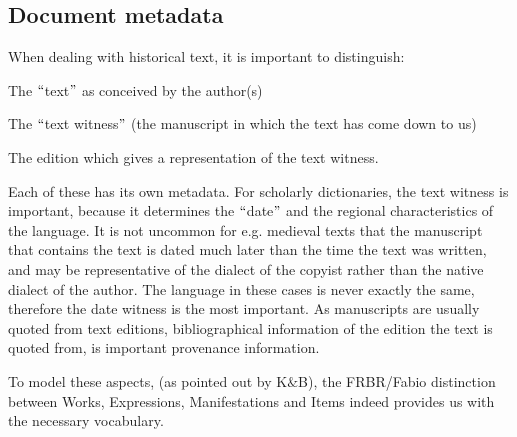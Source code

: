 \documentclass[10pt]{article}
\let\tempone\itemize
\let\temptwo\enditemize
\renewenvironment{itemize}{\tempone\setlength\itemsep{-0.5pt}}{\temptwo}
\begin{document}








\subsection{Document metadata }
\label{ssec:witness}

When dealing with historical text, it is important to distinguish:


\begin{itemize}
\item The $``$text$"$ as conceived by the author(s)

\item The $``$text witness$"$  (the manuscript in which the text has come down to us)

\item The edition which gives a representation of the text witness.
\end{itemize}


 Each of these has its own metadata. For scholarly dictionaries, the text witness is important, because it determines the $``$date$"$  and the regional characteristics of the language. It is not uncommon for e.g. medieval texts that the manuscript that contains the text is dated much later than the time the text was written, and may be representative of the dialect of the copyist rather than the native dialect of the author. The language in these cases is never exactly the same, therefore the date witness is the most important. As manuscripts are usually quoted from text editions, bibliographical information of the edition the text is quoted from, is important provenance information.

To model these aspects, (as pointed out by K$\&$B), the FRBR/Fabio distinction between Works, Expressions, Manifestations and Items indeed provides us with the necessary vocabulary.
 
\end{document}
